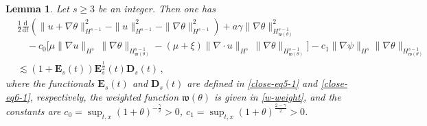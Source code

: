 \documentclass[reqno,11pt]{amsart}
\newtheorem{lemma}{Lemma}[section]
\numberwithin{equation}{section}
\def\d{\mathrm{d}}
\def\w{\mathfrak{w}}
\begin{document}
\begin{lemma}\label{Lmm-G6}
    Let $s \ge 3$ be an integer. Then one has
\begin{equation}\label{theta-eq-estimate}
\begin{aligned}
&\frac{1}{2} \frac{\d}{\d t} \left( \|u + \nabla \theta\|_{H^{s-1}}^2 - \|u\|_{H^{s-1}}^2 - \|\nabla \theta\|_{H^{s-1}}^2 \right) + a \gamma \|\nabla \theta\|^2_{H^{s-1}_{\w (\theta)}} \\
& \quad - c_0 \big[ \mu \| \nabla u \|_{H^s} \, \| \nabla \theta \|_{H^{s-1}_{\w (\theta)}} - (\mu + \xi ) \| \nabla \cdot u \|_{H^s} \, \| \nabla \theta \|_{H^{s-1}_{\w (\theta)}} \big] - c_1 \|\nabla \psi\|_{H^s} \|\nabla \theta\|_{H^{s-1}_{\w (\theta)}} \\
& \lesssim \left( 1 + \mathbf{E}_s (t) \right) \mathbf{E}_s^\frac{1}{2} (t) \mathbf{D}_s (t) \,,
\end{aligned}
\end{equation}
where the functionals $\mathbf{E}_s (t)$ and $\mathbf{D}_s (t)$ are defined  in \eqref{close-eq5-1} and \eqref{close-eq6-1}, respectively, the weighted function $\w (\theta)$ is given in \eqref{w-weight}, and the constants are $c_0 = \sup_{t,x} (1 + \theta)^{- \frac{\gamma}{2}} > 0$, $c_1 = \sup_{t,x} (1 + \theta)^\frac{2 - \gamma}{2} > 0 $.
\end{lemma}
\end{document}
